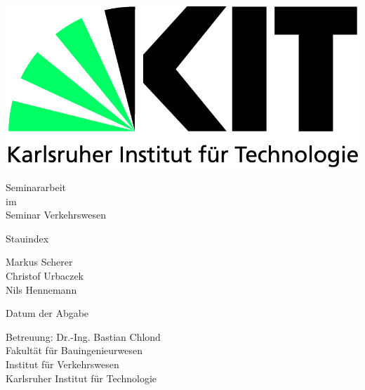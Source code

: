 \begin{titlepage}

    \includegraphics[scale=0.45]{images/0_kit-logo.jpg} 
    \vspace*{2cm} 

    \begin{center} \large 
    
        Seminararbeit \\
        im \\
        Seminar Verkehrswesen
    
        \vspace*{2cm}

        {\huge Stauindex}
        \vspace*{2.5cm}

        Markus Scherer\\
        Christof Urbaczek\\
        Nils Hennemann
    
        \vspace*{1.0cm}

        Datum der Abgabe %
        \vspace*{2.5cm}

        Betreuung: Dr.-Ing. Bastian Chlond \\[1cm]
        Fakultät für Bauingenieurwesen \\[0.5cm]
        Institut für Verkehrswesen \\[1cm]
        Karlsruher Institut für Technologie

    \end{center}
  \end{titlepage}
